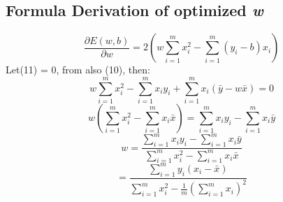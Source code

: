 \documentclass{article}
\begin{document}
\subsection{Formula Derivation of optimized \textit{w}}
\begin{equation}
\frac{\partial E(w, b)}{\partial w} = 2(w \sum_{i = 1}^m x_i^2 - \sum_{i = 1}^m (y_i - b)x_i)
\end{equation}
Let(11) = 0, from also (10), then:
\begin{equation}
w \sum_{i = 1}^m x_i^2 - \sum_{i=1}^m x_i y_i + \sum_{i=1}^m x_i(\bar{y} - w\bar{x}) = 0 
\end{equation}
\[w(\sum_{i=1}^m x_i^2-\sum_{i=1}^m x_i \bar{x}) = \sum_{i=1}^m x_i y_i - \sum_{i=1}^m x_i \bar{y}\]
\[w = \frac{\sum_{i=1}^m x_i y_i - \sum_{i=1}^m x_i \bar{y}}{\sum_{i=1}^m x_i^2 - \sum_{i=1}^m x_i \bar{x}}\]
\begin{equation}
= \frac{\sum_{i=1}^m y_i(x_i - \bar{x})}{\sum_{i=1}^m x_i^2 - \frac{1}{m} (\sum_{i=1}^m x_i)^2}
\end{equation}
\end{document}
